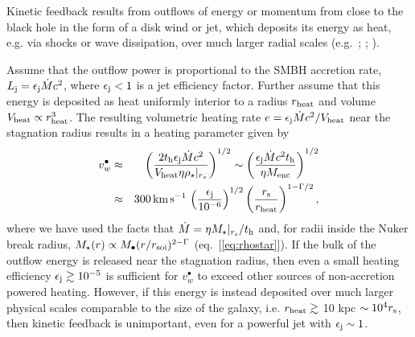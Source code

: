 \documentclass[usenatbib,fleqn]{mn2e}
\begin{document}
Kinetic feedback results from outflows of energy or momentum from close to the black hole in the form of a disk wind or jet, which deposits its energy as heat, e.g. via shocks or wave dissipation, over much larger radial scales (e.g.~\citealt{McNamara&Nulsen07}; \citealt{Novak+11}; \citealt{Gaspari+12}).  

Assume that the outflow power is proportional to the SMBH accretion rate, $L_{\rm j} =
\epsilon_{\rm j} \dot{M}c^{2}$, where $\epsilon_{\rm j} < 1$ is a jet efficiency factor.  Further assume that this energy is deposited as heat uniformly interior to a radius $r_{\rm heat}$ and volume $V_{\rm heat} \propto r_{\rm
heat}^{3}$.  The resulting volumetric heating rate $e = \epsilon_{\rm
j}\dot{M}c^{2}/V_{\rm heat}$ near the stagnation radius results in a heating parameter given by
\begin{eqnarray} v_{w}^{\bullet} &\approx& \left(\frac{2t_{\rm
h}\epsilon_{\rm j}\dot{M}c^{2}}{V_{\rm heat}\eta
\rho_{\star}|_{r_{s}}}\right)^{1/2} \sim \left(\frac{\epsilon_{\rm
j}\dot{M}c^{2}t_{\rm h}}{\eta M_{\rm enc}}\right)^{1/2} \nonumber \\
&\approx& 300\,{\rm km\,s^{-1}}\,\left(\frac{\epsilon_{\rm j}}{10^{-6}}\right)^{1/2}\left(\frac{r_{\rm s}}{r_{\rm
heat}}\right)^{1-\Gamma/2},
\label{eq:vjet}
\end{eqnarray} 
where we have used the facts that $\dot{M} = \eta M_{\star}|_{r_{\rm s}}/t_{\rm h}$ and, for radii inside the Nuker break radius, $M_{\star}(r) \propto
M_{\bullet}(r/r_{\rm soi})^{2-\Gamma}$ (eq.~[\ref{eq:rhostar}]).  If the bulk of the outflow energy is released near the stagnation radius, then even a small heating efficiency $\epsilon_{\rm j} \gtrsim
10^{-5}$ is sufficient for $v_{w}^{\bullet}$ to exceed other sources of non-accretion powered heating.  However, if this energy is instead deposited over much larger physical scales comparable to the size of the galaxy, i.e. $r_{\rm heat} \gtrsim $ 10 kpc $\sim 10^{4}r_{\rm s}$, then kinetic feedback is unimportant, even for a powerful jet with $\epsilon_{\rm j} \sim 1$.  
\end{document}
